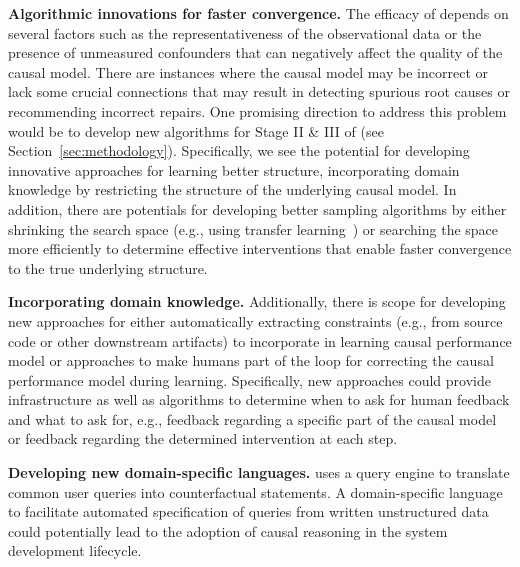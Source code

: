 \noindent \textbf{Algorithmic innovations for faster convergence.} The efficacy of \ourapproach depends on several factors such as the representativeness of the observational data or the presence of unmeasured confounders that can negatively affect the quality of the causal model. There are instances where the causal model may be incorrect or lack some crucial connections that may result in detecting spurious root causes or recommending incorrect repairs. One promising direction to address this problem would be to develop new algorithms for Stage II \& III of \ourapproach (see Section~\ref{sec:methodology}). Specifically, we see the potential for developing innovative approaches for learning better structure, incorporating domain knowledge by restricting the structure of the underlying causal model. In addition, there are potentials for developing better sampling algorithms by either shrinking the search space (e.g., using transfer learning~\cite{JVKS:FSE18}) or searching the space more efficiently to determine effective interventions that enable faster convergence to the true underlying structure. 

\noindent \textbf{Incorporating domain knowledge.} Additionally, there is scope for developing new approaches for either automatically extracting constraints (e.g., from source code or other downstream artifacts) to incorporate in learning causal performance model or approaches to make humans part of the loop for correcting the causal performance model during learning. Specifically, new approaches could provide infrastructure as well as algorithms to determine when to ask for human feedback and what to ask for, e.g., feedback regarding a specific part of the causal model or feedback regarding the determined intervention at each step.

\noindent \textbf{Developing new domain-specific languages.} \ourapproach uses a query engine to translate common user queries into counterfactual statements. A domain-specific language to facilitate automated specification of queries from written unstructured data could potentially lead to the adoption of causal reasoning in the system development lifecycle. 